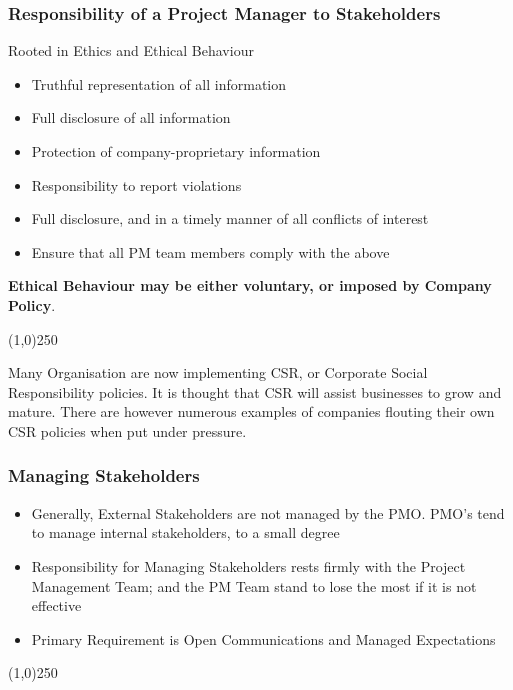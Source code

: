 \begin{frame}
\frametitle{Responsibility of a Project Manager to Stakeholders}
Rooted in Ethics and Ethical Behaviour\\
\begin{itemize}
\item Truthful representation of all information
\item Full disclosure of all information
\item Protection of company-proprietary information
\item Responsibility to report violations
\item Full disclosure, and in a timely manner of all conflicts of interest
\item Ensure that all PM team members comply with the above
\end{itemize}
\textbf{Ethical Behaviour may be either voluntary, or imposed by Company Policy}.\\
\end{frame}
\begin{center}\line(1,0){250}\end{center}
Many Organisation are now implementing CSR, or Corporate Social Responsibility policies.  It is thought that CSR will assist businesses to grow and mature.  There are however numerous examples of companies flouting their own CSR policies when put under pressure.




\begin{frame}
\frametitle{Managing Stakeholders}
\begin{itemize}
	\item Generally, External Stakeholders are not managed by the PMO.  PMO's tend to manage internal stakeholders, to a small degree
	\item Responsibility for Managing Stakeholders rests firmly with the Project Management Team; and the PM Team stand to lose the most if it is not effective
	\item Primary Requirement is Open Communications and Managed Expectations
\end{itemize}
\end{frame}
\begin{center}\line(1,0){250}\end{center}




